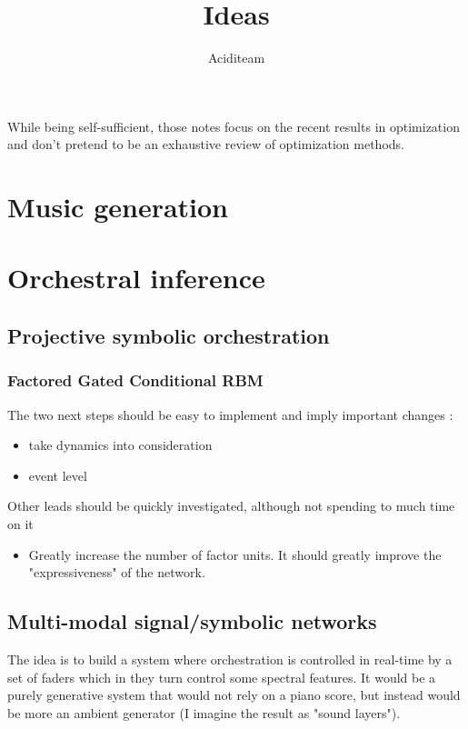 \documentclass{report}
\title{Ideas}
\author{Aciditeam}
\begin{document}
\maketitle
While being self-sufficient, those notes focus on the recent results in optimization and don't pretend to be an exhaustive review of optimization methods.

\chapter{Music generation}

\chapter{Orchestral inference}
\section{Projective symbolic orchestration}
\subsection{Factored Gated Conditional RBM}
The two next steps should be easy to implement and imply important changes :
\begin{itemize}
\item take dynamics into consideration
\item event level
\end{itemize}

Other leads should be quickly investigated, although not spending to much time on it
\begin{itemize}
\item Greatly increase the number of factor units. It should greatly improve the "expressiveness" of the network.
\end{itemize} 

\section{Multi-modal signal/symbolic networks}
The idea is to build a system where orchestration is controlled in real-time by a set of faders which in they turn control some spectral features. It would be a purely generative system that would not rely on a piano score, but instead would be more an ambient generator (I imagine the result as "sound layers").
\end{document}
